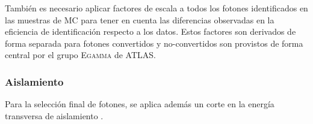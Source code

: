 También es necesario aplicar factores de escala a todos los fotones
identificados en las muestras de MC para tener en cuenta las diferencias
observadas en la eficiencia de identificación respecto a los datos. Estos
factores son derivados de forma separada para fotones convertidos y
no-convertidos son provistos de forma central por el grupo
\textsc{Egamma} de ATLAS.


\subsubsection{Aislamiento}

Para la selección final de fotones, se aplica además un corte en la energía
transversa de aislamiento {\etiso}.






